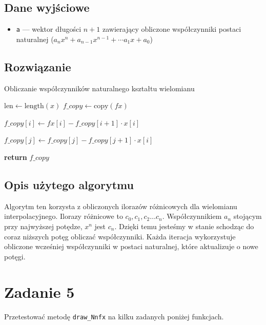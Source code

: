 \documentclass{article}
\begin{document}
\subsection*{Dane wyjściowe}
	\begin{itemize}
	    \item \texttt{a} — wektor długości $n+1$ zawierający obliczone współczynniki postaci naturalnej ($a_n x^n + a_{n-1} x^{n-1} + \cdots a_1 x + a_0$)
	\end{itemize}
\subsection*{Rozwiązanie}
	\begin{algorithm}
	\caption{Obliczanie współczynników naturalnego kształtu wielomianu}
	\begin{algorithmic}[1]
	        \State $\text{len} \gets \text{length}(x)$
	        \State $f\_copy \gets \text{copy}(fx)$
	        
	            \State $f\_copy[i] \gets fx[i] - f\_copy[i + 1] \cdot x[i]$
	            
	                \State $f\_copy[j] \gets f\_copy[j] - f\_copy[j + 1] \cdot x[i]$
	            \EndFor
	        \EndFor
	        
	        \State \textbf{return} $f\_copy$
	    \EndFunction
	\end{algorithmic}
	\end{algorithm}
\subsection*{Opis użytego algorytmu}
	Algorytm ten korzysta z obliczonych ilorazów różnicowych dla wielomianu interpolacyjnego. Ilorazy różnicowe to $c_0, c_1, c_2 \dots c_n$. Współczynnikiem $a_n$ stojącym przy najwyższej potędze, $x^n$ jest $c_n$. Dzięki temu jesteśmy w stanie schodząc do coraz niższych potęg obliczać współczynniki. Każda iteracja wykorzystuje obliczone wcześniej współczynniki w postaci naturalnej, które aktualizuje o nowe potęgi.

\clearpage

\section*{Zadanie 5}
	Przetestować metodę \texttt{draw\_Nnfx} na kilku zadanych poniżej funkcjach.
\end{document}
